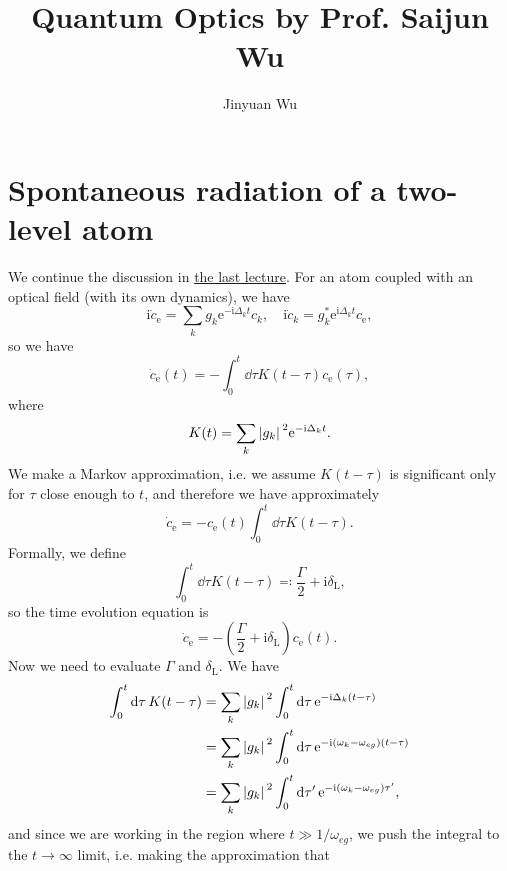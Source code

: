 \documentclass[hyperref, a4paper]{article}
\title{Quantum Optics by Prof. Saijun Wu}
\author{Jinyuan Wu}
\newcommand*{\ii}{\mathrm{i}}
\newcommand*{\ee}{\mathrm{e}}
\begin{document}
\maketitle

\section{Spontaneous radiation of a two-level atom}\label{sec:spon-rad}

We continue the discussion in \href{11-18.pdf}{the last lecture}.
For an atom coupled with an optical field (with its own dynamics), we have 
\[
    \ii \dot{c}_\text{e} = \sum_k g_k \ee^{- \ii \Delta_k t} c_k, \quad 
    \ii \dot{c}_k = g_k^* \ee^{\ii \Delta_k t} c_\text{e},
\]
so we have 
\begin{equation}
    \dot{c}_\text{e}(t) = - \int_0^t \dd{\tau} K(t - \tau) c_\text{e}(\tau),
    \label{eq:one-component-eom}
\end{equation}
where 
\begin{equation}
    K(t) = \sum_k \abs*{g_k}^2 \ee^{- \ii \Delta_k t}.
\end{equation}
We make a Markov approximation, i.e. we assume $K(t - \tau)$ is significant only for $\tau$ close enough to $t$,
and therefore we have approximately
\[
    \dot{c}_\text{e} = - c_\text{e}(t) \int_0^t \dd{\tau} K(t - \tau).
\]
Formally, we define 
\begin{equation}
    \int_0^t \dd{\tau} K(t - \tau) \eqqcolon \frac{\Gamma}{2} + \ii \delta_\text{L},
\end{equation}
so the time evolution equation is 
\begin{equation}
    \dot{c}_\text{e} = - \left( \frac{\Gamma}{2} + \ii \delta_\text{L} \right) c_\text{e}(t) .
    \label{eq:markov-eq}
\end{equation}
Now we need to evaluate $\Gamma$ and $\delta_\text{L}$. We have 
\[
    \begin{aligned}
        \int_0^t \dd{\tau} K(t - \tau) &= \sum_k \abs*{g_k}^2 \int_0^t \dd{\tau} \ee^{- \ii \Delta_k (t - \tau)} \\
        &= \sum_k \abs*{g_k}^2 \int_0^t \dd{\tau} \ee^{- \ii (\omega_k - \omega_{eg}) (t - \tau)} \\
        &= \sum_k \abs*{g_k}^2 \int_0^t \dd{\tau'} \ee^{- \ii (\omega_k - \omega_{eg}) \tau' },
    \end{aligned}
\]
and since we are working in the region where $t \gg 1 / \omega_{eg}$, we push the integral to the $t \to \infty$ 
limit, i.e. making the approximation that 
\end{document}
